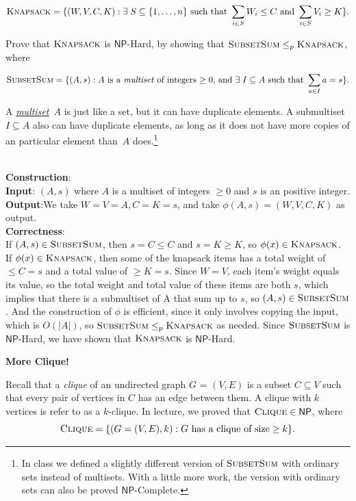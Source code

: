 \documentclass[11pt,addpoints,answers]{exam}
\newcommand{\NP}{\textsf{NP}}
\newcommand{\NPHard}{\NP\text{-Hard}}
\newcommand{\NPComplete}{\NP\text{-Complete}}
\newcommand{\ptimemap}{\leq_p}
\newcommand{\Knapsack}{\textsc{Knapsack}}
\newcommand{\SubsetSum}{\textsc{SubsetSum}}
\newcommand{\clique}{\textsc{Clique}}
\begin{document}
\begin{questions}
    \[ 
        \Knapsack = \set{ (W, V, C, K) : \exists\; S\subseteq \set{1,\ldots,n} \text{ such that } \sum_{i\in S} W_{i} \leq C \text{ and } \sum_{i\in S} V_{i} \geq K }.
    \]

    Prove that $\Knapsack$ is $\NPHard$, by showing that $\SubsetSum \ptimemap \Knapsack$, where
    
    \[ 
        \SubsetSum = \set{(A, s) : A \text{ is a \emph{multiset} of integers $\geq 0$, and } \exists\; I \subseteq A \text{ such that } \sum_{a \in I} a = s}.
    \]
    
    A \href{https://en.wikipedia.org/wiki/Multiset}{\emph{multiset}}~$A$ is just like a set, but it can have duplicate elements. A submultiset $I \subseteq A$ also can have duplicate elements, as long as it does not have more copies of an particular element than~$A$ does.\footnote{In class we defined a slightly different version of $\SubsetSum$ with ordinary sets instead of multisets. With a little more work, the version with ordinary sets can also be proved $\NPComplete$.}

    \begin{solution}\\
\textbf{Construction}:
\\\textbf{Input}: $(A, s)$ where $A$ is a multiset of integers $\geq 0$ and $s$ is an positive integer.
\\\textbf{Output}:We take $W = V=A, C=K=s$, and take $\phi(A, s) = (W,V,C,K)$ as output.
\\\textbf{Correctness}:\\
If $(A,s) \in \SubsetSum$, then $s = C \leq C$ and $s = K \geq K$, so $\phi(x) \in \Knapsack$. \\
If $\phi(x) \in \Knapsack$, then some of the knapsack items has a total weight of $\leq C = s$ and a total value of $\geq K = s$. Since $W = V$, each item's weight equals its value, so the total weight and total value of these items are both $s$, which implies that there is a submultiset of A that sum up to $s$, so $(A,s) \in \SubsetSum$.
And the construction of $\phi$ is efficient, since it only involves copying the input, which is $O(|A|)$, so $\SubsetSum \leq_p \Knapsack$ as needed. Since $\SubsetSum$ is $\NP$-Hard, we have shown that $\Knapsack$ is $\NP$-Hard.
    \end{solution}

    \question \textbf{More Clique!} 
    
    Recall that a \emph{clique} of an undirected graph $G$ = $(V,E)$ is a subset $C \subseteq V$ such that every pair of vertices in $C$ has an edge between them. A clique with $k$ vertices is refer to as a $k$-clique. In lecture, we proved that $\clique\in\NP$, where
    \[
        \clique = \set{(G = (V,E), k) : G \text{ has a clique of size}\geq k}.
    \]
    

\end{questions}
\end{document}
